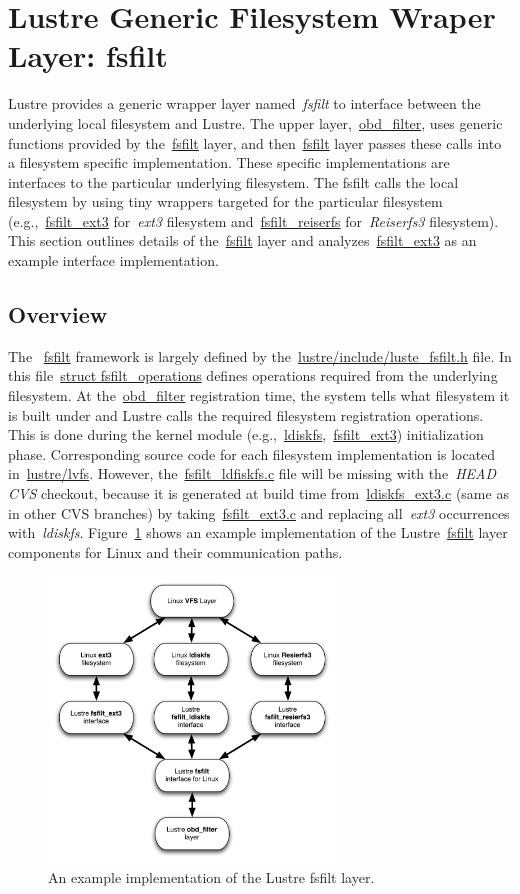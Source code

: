 \section{Lustre Generic Filesystem Wraper Layer: fsfilt}

Lustre provides a generic wrapper layer named~\emph{fsfilt} to interface
between the underlying local filesystem and Lustre. The upper
layer,~\url{obd_filter}, uses generic functions provided by the~\url{fsfilt}
layer, and then~\url{fsfilt} layer passes these calls into a filesystem specific
implementation. These specific implementations are interfaces to the particular
underlying filesystem. The fsfilt calls the local filesystem by using tiny
wrappers targeted for the particular filesystem (e.g.,~\url{fsfilt_ext3}
for~\emph{ext3} filesystem and~\url{fsfilt_reiserfs} for~\emph{Reiserfs3}
filesystem). This section outlines details of the~\url{fsfilt} layer and
analyzes~\url{fsfilt_ext3} as an example interface implementation.

\subsection{Overview}
\label{sec:fsfilt_linux}

The ~\url{fsfilt} framework is largely defined by
the~\url{lustre/include/luste_fsfilt.h} file. In this file~\url{struct
fsfilt_operations} defines operations required from the underlying filesystem.
At the~\url{obd_filter} registration time, the system tells what filesystem it is
built under and Lustre calls the required filesystem registration operations.
This is done during the kernel module (e.g.,~\url{ldiskfs},~\url{fsfilt_ext3})
initialization phase. Corresponding source code for each filesystem
implementation is located in~\url{lustre/lvfs}.  However,
the~\url{fsfilt_ldfiskfs.c} file will be missing with the~\emph{HEAD CVS}
checkout, because it is generated at build time from~\url{ldiskfs_ext3.c} (same
as in other CVS branches) by taking~\url{fsfilt_ext3.c} and replacing
all~\emph{ext3} occurrences with~\emph{ldiskfs}.
Figure~\ref{fig:fsfilt_outline} shows an example implementation of the
Lustre~\url{fsfilt} layer components for Linux and their communication paths.

\begin{figure}[hbt]
\centering
\includegraphics[width=3in]{img/fsfilt_outline}
\caption{An example implementation of the Lustre fsfilt layer.}
\label{fig:fsfilt_outline}
\end{figure}

